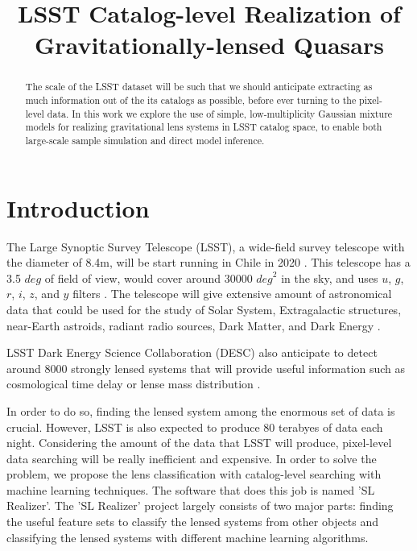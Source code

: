 \documentclass[\docopts]{\docclass}
\begin{document}
\title{ LSST Catalog-level Realization of Gravitationally-lensed Quasars }

\maketitlepre

\begin{abstract}

The scale of the LSST dataset will be such that we should anticipate
extracting as much information out of the its catalogs as possible,
before ever turning to the pixel-level data. In this work we explore the
use of simple, low-multiplicity Gaussian mixture models for realizing
gravitational lens systems in LSST catalog space, to enable both
large-scale sample simulation and direct model inference.

\end{abstract}



\section{Introduction}
\label{sec:intro}

The Large Synoptic Survey Telescope (LSST), a wide-field survey telescope with the diameter of 8.4m, will be start running in Chile in 2020 \cite{LSST_overall}. This telescope has a 3.5 $deg$ of field of view, would cover around 30000 $\textit{deg}^2$ in the sky, and uses $u$, $g$, $r$, $i$, $z$, and $y$ filters \cite{LSSTScienceBookv2}. The telescope will give extensive amount of astronomical data that could be used for the study of Solar System, Extragalactic structures, near-Earth astroids, radiant radio sources, Dark Matter, and Dark Energy \cite{LSSTScienceBookv2}. 

LSST Dark Energy Science Collaboration (DESC) also anticipate to detect around 8000 strongly lensed systems that will provide useful information such as cosmological time delay or lense mass distribution \cite{DESC_overall} \cite{TimeDelayOverall} \cite{Twinkles}. 

In order to do so, finding the lensed system among the enormous set of data is crucial. However, LSST is also expected to produce 80 terabyes of data each night. %
Considering the amount of the data that LSST will produce, pixel-level data searching will be really inefficient and expensive. In order to solve the problem, we propose the lens classification with catalog-level searching with machine learning techniques. The software that does this job is named 'SL Realizer'. The 'SL Realizer' project largely consists of two major parts: finding the useful feature sets to classify the lensed systems from other objects and classifying the lensed systems with different machine learning algorithms.  
\end{document}
